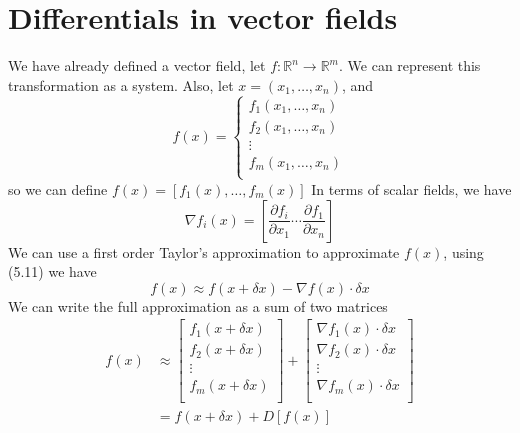 \documentclass[../linear-spaces.tex]{subfiles}
\begin{document}
\section{Differentials in vector fields}
We have already defined a vector field, let $f:\mathbb{R}^{n} \to \mathbb{R}^{m}$.
We can represent this transformation as a system. Also, let $x=(x_1,\dots,x_n)$, and
\begin{equation}
    f({x})=\begin{cases}
        f_1(x_1,\dots,x_n) \\
        f_2(x_1,\dots,x_n) \\
        \vdots             \\
        f_m(x_1,\dots,x_n) \\
    \end{cases}
\end{equation}
so we can define $f({x}) = \left[f_1({x}), \dots,f_m({x})\right]$
In terms of scalar fields, we have
\begin{equation}
    \nabla f_i({x}) = \left[\dfrac{\partial f_i}{\partial x_1} \cdots \dfrac{\partial f_1}{\partial x_n}\right]
\end{equation}
We can use a first order Taylor's approximation to approximate $f(x)$, using (5.11) we have
\begin{equation}
    f(x) \approx f(x+\delta x) - \nabla f(x)\cdot \delta x
\end{equation}
We can write the full approximation as a sum of two matrices
\begin{equation}
    \begin{split}
        f(x) &\approx \begin{bmatrix}
            f_1(x+\delta x) \\
            f_2(x+\delta x) \\
            \vdots          \\
            f_m(x+\delta x) \\
        \end{bmatrix} + \begin{bmatrix}
            \nabla f_1(x)\cdot\delta x \\
            \nabla f_2(x)\cdot\delta x \\
            \vdots                     \\
            \nabla f_m(x)\cdot\delta x \\
        \end{bmatrix} \\[1em]
        &= f(x+\delta x) + D[f(x)]
    \end{split}
\end{equation}
\end{document}
